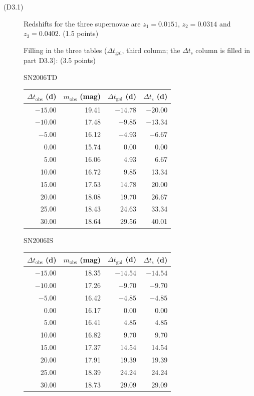 \begin{description}
\item[(D3.1)] Redshifts for the three supernovae are $z_1 = 0.0151$,
  $z_2 = 0.0314$ and $z_3 = 0.0402$. \hfill(1.5 points)

  Filling in the three tables ($\Delta t_{\mathrm{gal}}$, third column; the
  $\Delta t_{\mathrm{s}}$ column is filled in part D3.3): \hfill(3.5 points)

  \begin{center}
  SN2006TD

  \begin{tabular}{rrrr}
    $\Delta t_{\mathrm{obs}}$ (d) & $m_{\mathrm{obs}}$ (mag) &
    $\Delta t_{\mathrm{gal}}$ (d) & $\Delta t_{\mathrm{s}}$ (d) \\
    \hline
    $-15.00$ & 19.41 & $-14.78$ & $-20.00$ \\
    $-10.00$ & 17.48 & $-9.85$  & $-13.34$ \\
    $-5.00$  & 16.12 & $-4.93$  & $-6.67$  \\
    0.00     & 15.74 & 0.00     & 0.00     \\
    5.00     & 16.06 & 4.93     & 6.67     \\
    10.00    & 16.72 & 9.85     & 13.34    \\
    15.00    & 17.53 & 14.78    & 20.00    \\
    20.00    & 18.08 & 19.70    & 26.67    \\
    25.00    & 18.43 & 24.63    & 33.34    \\
    30.00    & 18.64 & 29.56    & 40.01    \\
  \end{tabular}

  \medskip
  SN2006IS

  \begin{tabular}{rrrr}
    $\Delta t_{\mathrm{obs}}$ (d) & $m_{\mathrm{obs}}$ (mag) &
    $\Delta t_{\mathrm{gal}}$ (d) & $\Delta t_{\mathrm{s}}$ (d) \\
    \hline
    $-15.00$ & 18.35 & $-14.54$ & $-14.54$ \\
    $-10.00$ & 17.26 & $-9.70$  & $-9.70$  \\
    $-5.00$  & 16.42 & $-4.85$  & $-4.85$  \\
    0.00     & 16.17 & 0.00     & 0.00     \\
    5.00     & 16.41 & 4.85     & 4.85     \\
    10.00    & 16.82 & 9.70     & 9.70     \\
    15.00    & 17.37 & 14.54    & 14.54    \\
    20.00    & 17.91 & 19.39    & 19.39    \\
    25.00    & 18.39 & 24.24    & 24.24    \\
    30.00    & 18.73 & 29.09    & 29.09    \\
  \end{tabular}


\end{center}
\end{description}
